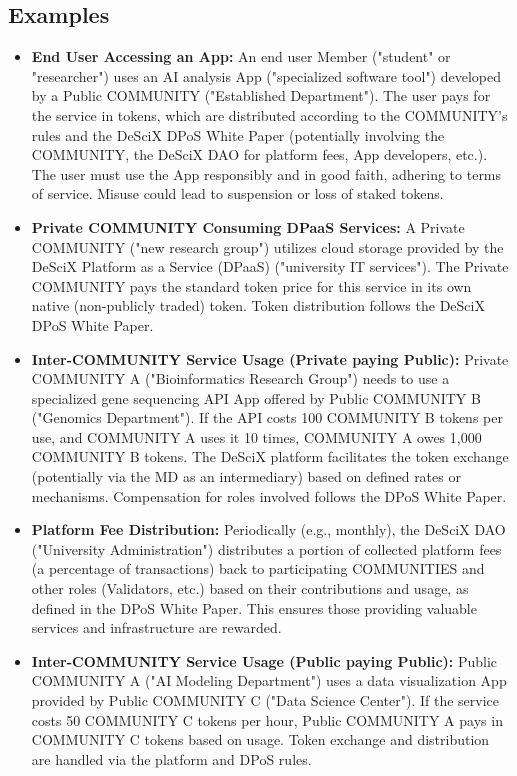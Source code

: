 \documentclass{article}
\begin{document}
\subsection{Examples} \label{sec:examples}

\begin{itemize}
    \item \textbf{End User Accessing an App:} An end user Member ("student" or "researcher") uses an AI analysis App ("specialized software tool") developed by a Public COMMUNITY ("Established Department"). The user pays for the service in tokens, which are distributed according to the COMMUNITY's rules and the DeSciX DPoS White Paper (potentially involving the COMMUNITY, the DeSciX DAO for platform fees, App developers, etc.). The user must use the App responsibly and in good faith, adhering to terms of service. Misuse could lead to suspension or loss of staked tokens.

    \item \textbf{Private COMMUNITY Consuming DPaaS Services:} A Private COMMUNITY ("new research group") utilizes cloud storage provided by the DeSciX Platform as a Service (DPaaS) ("university IT services"). The Private COMMUNITY pays the standard token price for this service in its own native (non-publicly traded) token. Token distribution follows the DeSciX DPoS White Paper.

    \item \textbf{Inter-COMMUNITY Service Usage (Private paying Public):} Private COMMUNITY A ("Bioinformatics Research Group") needs to use a specialized gene sequencing API App offered by Public COMMUNITY B ("Genomics Department"). If the API costs 100 COMMUNITY B tokens per use, and COMMUNITY A uses it 10 times, COMMUNITY A owes 1,000 COMMUNITY B tokens. The DeSciX platform facilitates the token exchange (potentially via the MD as an intermediary) based on defined rates or mechanisms. Compensation for roles involved follows the DPoS White Paper.

    \item \textbf{Platform Fee Distribution:} Periodically (e.g., monthly), the DeSciX DAO ("University Administration") distributes a portion of collected platform fees (a percentage of transactions) back to participating COMMUNITIES and other roles (Validators, etc.) based on their contributions and usage, as defined in the DPoS White Paper. This ensures those providing valuable services and infrastructure are rewarded.

    \item \textbf{Inter-COMMUNITY Service Usage (Public paying Public):} Public COMMUNITY A ("AI Modeling Department") uses a data visualization App provided by Public COMMUNITY C ("Data Science Center"). If the service costs 50 COMMUNITY C tokens per hour, Public COMMUNITY A pays in COMMUNITY C tokens based on usage. Token exchange and distribution are handled via the platform and DPoS rules.


\end{itemize}
\end{document}
